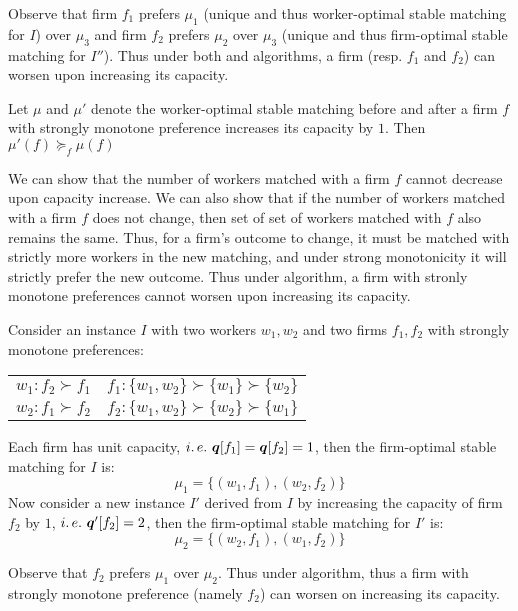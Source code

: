 Observe that firm $f_1$ prefers $\mu_1$ (unique and thus worker-optimal stable matching for $I$) over $\mu_3$ and firm $f_2$ prefers $\mu_2$ over $\mu_3$ (unique and thus firm-optimal stable matching for $I''$). Thus under both \WPDA and \FPDA algorithms, a firm (resp. $f_1$ and $f_2$) can worsen upon increasing its capacity.

\newpage

\begin{proposition}
  Let $\mu$ and $\mu'$ denote the worker-optimal stable matching before and after a firm $f$ with strongly monotone preference increases its capacity by $1$. Then $\mu'(f) \succeq_f \mu(f)$
\end{proposition}

We can show that the number of workers matched with a firm $f$ cannot decrease upon capacity increase. We can also show that if the number of workers matched with a firm $f$ does not change, then set of set of workers matched with $f$ also remains the same. Thus, for a firm's outcome to change, it must be matched with strictly more workers in the new matching, and under strong monotonicity it will strictly prefer the new outcome. Thus under \WPDA algorithm, a firm with stronly monotone preferences cannot worsen upon increasing its capacity.

\begin{example}
  Consider an instance $I$ with two workers $w_1, w_2$ and two firms $f_1, f_2$ with strongly monotone preferences:
  \begin{center}
    \begin{tabular}{c|c}
      $w_1: f_2 \succ f_1$ & $f_1: \{w_1, w_2\} \succ \{w_1\} \succ \{w_2\}$ \\
      $w_2: f_1 \succ f_2$ & $f_2: \{w_1, w_2\} \succ \{w_2\} \succ \{w_1\}$
    \end{tabular}
  \end{center}
  Each firm has unit capacity, $i.\,e.\  \boldsymbol{q}[f_1] = \boldsymbol{q}[f_2] = 1$, then the firm-optimal stable matching for $I$ is:
  $$\mu_1 = \{ (w_1, f_1), (w_2, f_2) \}$$
  Now consider a new instance $I'$ derived from $I$ by increasing the capacity of firm $f_2$ by $1$, $i.\,e.\  \boldsymbol{q}'[f_2] = 2$, then the firm-optimal stable matching for $I'$ is:
  $$\mu_2 = \{ (w_2, f_1), (w_1, f_2) \}$$
\end{example}

Observe that $f_2$ prefers $\mu_1$ over $\mu_2$. Thus under \FPDA algorithm, thus a firm with strongly monotone preference (namely $f_2$) can worsen on increasing its capacity.


